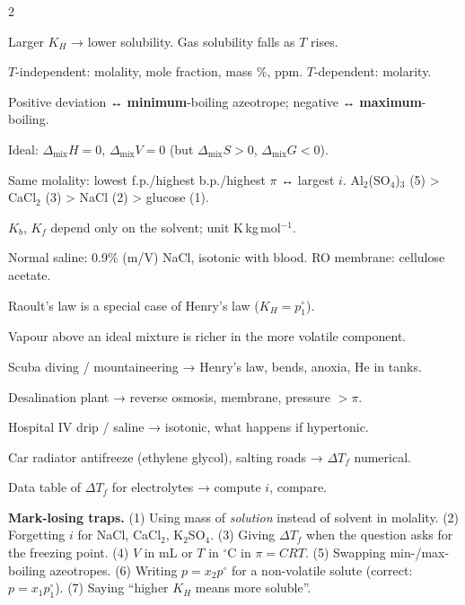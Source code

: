 \documentclass[10pt,a4paper]{extarticle}
\begin{document}
\begin{multicols}{2}
\begin{fl}
\item Larger $K_H$ → lower solubility. Gas solubility falls as $T$ rises.
\item $T$-independent: molality, mole fraction, mass \%, ppm. $T$-dependent: molarity.
\item Positive deviation ↔ \textbf{minimum}-boiling azeotrope; negative ↔ \textbf{maximum}-boiling.
\item Ideal: $\Delta_\text{mix}H=0$, $\Delta_\text{mix}V=0$ (but $\Delta_\text{mix}S>0$, $\Delta_\text{mix}G<0$).
\item Same molality: lowest f.p./highest b.p./highest $\pi$ ↔ largest $i$. Al$_2$(SO$_4$)$_3$ (5) > CaCl$_2$ (3) > NaCl (2) > glucose (1).
\item $K_b$, $K_f$ depend only on the solvent; unit K\,kg\,mol$^{-1}$.
\item Normal saline: 0.9\% (m/V) NaCl, isotonic with blood. RO membrane: cellulose acetate.
\item Raoult's law is a special case of Henry's law ($K_H=p_1^\circ$).
\item Vapour above an ideal mixture is richer in the more volatile component.
\end{fl}

\begin{fl}
\item Scuba diving / mountaineering → Henry's law, bends, anoxia, He in tanks.
\item Desalination plant → reverse osmosis, membrane, pressure $>\pi$.
\item Hospital IV drip / saline → isotonic, what happens if hypertonic.
\item Car radiator antifreeze (ethylene glycol), salting roads → $\Delta T_f$ numerical.
\item Data table of $\Delta T_f$ for electrolytes → compute $i$, compare.
\end{fl}

\begin{tip}\Tip \textbf{Mark-losing traps.} (1) Using mass of \emph{solution} instead of solvent in molality. (2) Forgetting $i$ for NaCl, CaCl$_2$, K$_2$SO$_4$. (3) Giving $\Delta T_f$ when the question asks for the freezing point. (4) $V$ in mL or $T$ in $^\circ$C in $\pi=CRT$. (5) Swapping min-/max-boiling azeotropes. (6) Writing $p=x_2p^\circ$ for a non-volatile solute (correct: $p=x_1p_1^\circ$). (7) Saying ``higher $K_H$ means more soluble''.\end{tip}
\end{multicols}
\begin{tcolorbox}[enhanced,colback=white,colframe=uc,boxrule=0.6pt,arc=2pt,title={\sffamily\bfseries\footnotesize My notes — Ch 1 Solutions},colbacktitle=uc,coltitle=white,height fill,before skip=4pt]
\end{tcolorbox}
\end{document}
